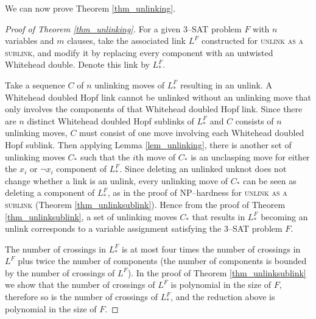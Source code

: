 \documentclass[12pt]{amsart}
\theoremstyle{definition}
\theoremstyle{remark}
\begin{document}
We can now prove Theorem \ref{thm_unlinking}.

\begin{proof}[Proof of Theorem \ref{thm_unlinking}]
For a given 3--\textsc{SAT} problem $F$ with $n$ variables and $m$ clauses, take the associated link $L^F$ constructed for \textsc{unlink as a sublink}, and modify it by replacing every component with an untwisted Whitehead double.
Denote this link by $L_{*}^F$.

Take a sequence $C$ of $n$ unlinking moves of $L_{*}^F$ resulting in an unlink.
A Whitehead doubled Hopf link cannot be unlinked without an unlinking move that only involves the components of that Whitehead doubled Hopf link.
Since there are $n$ distinct Whitehead doubled Hopf sublinks of $L_{*}^F$ and $C$ consists of $n$ unlinking moves, $C$ must consist of one move involving each Whitehead doubled Hopf sublink.
Then applying Lemma \ref{lem_unlinking}, there is another set of unlinking moves $C_*$ such that the $i$th move of $C_*$ is an unclasping move for either the $x_i$ or $\neg x_i$ component of $L_*^F$.
Since deleting an unlinked unknot does not change whether a link is an unlink, every unlinking move of $C_*$ can be seen as deleting a component of $L_*^F$, as in the proof of NP--hardness for \textsc{unlink as a sublink} (Theorem \ref{thm_unlinksublink}).
Hence from the proof of Theorem \ref{thm_unlinksublink}, a set of unlinking moves $C_*$ that results in $L_*^F$ becoming an unlink corresponds to a variable assignment satisfying the 3--\textsc{SAT} problem $F$.

The number of crossings in $L_*^F$ is at most four times the number of crossings in $L^F$ plus twice the number of components (the number of components is bounded by the number of crossings of $L^F$).
In the proof of Theorem \ref{thm_unlinksublink} we show that the number of crossings of $L^F$ is polynomial in the size of $F$, therefore so is the number of crossings of $L^F_*$, and the reduction above is polynomial in the size of $F$.
\end{proof}
\end{document}

